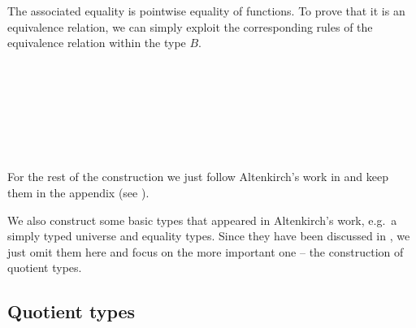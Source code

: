 The associated equality is pointwise equality of functions. To prove that it is an equivalence relation, we can simply exploit the corresponding rules of the equivalence relation within the type $B$.

\begin{code}
\\
\>[0]\<[9]%
\>[9]\AgdaSymbol{;}  \<[18]%
\>[18]\AgdaSymbol{=}  \AgdaInductiveConstructor{,} \AgdaSymbol{\_)} \AgdaSymbol{(} \AgdaInductiveConstructor{,} \AgdaSymbol{\_)}     \AgdaFunction{[}   \AgdaFunction{]}      \AgdaSymbol{\}}\<%
\\
\>[0]\<[9]%
\>[9]\AgdaSymbol{;}  \<[19]%
\>[19]\AgdaSymbol{=}    \AgdaFunction{[}  \AgdaSymbol{\_} \AgdaFunction{]refl} \<[40]%
\>[40]\<%
\\
\>[0]\<[9]%
\>[9]\AgdaSymbol{;}  \<[19]%
\>[19]\AgdaSymbol{=}     \AgdaFunction{[}  \AgdaSymbol{\_} \AgdaFunction{]sym} \AgdaSymbol{(} \AgdaSymbol{)}\<%
\\
\>[0]\<[9]%
\>[9]\AgdaSymbol{;}  \<[19]%
\>[19]\AgdaSymbol{=}      \AgdaFunction{[}  \AgdaSymbol{\_} \AgdaFunction{]trans} \AgdaSymbol{(} \AgdaSymbol{)} \AgdaSymbol{(} \AgdaSymbol{)}\<%
\\
\>[0]\<[9]%
\>[9]\AgdaSymbol{\}}\<%
\\
\end{code}

For the rest of the construction we just follow Altenkirch's work in \cite{alti:lics99} and keep them in the appendix (see ).


We also construct some basic types that appeared in Altenkirch's work, e.g.\ a simply typed universe and equality types. Since they have been discussed in \cite{alti:lics99}, we just omit them here and focus on the more important one -- the construction of quotient types.


\subsection{Quotient types}


